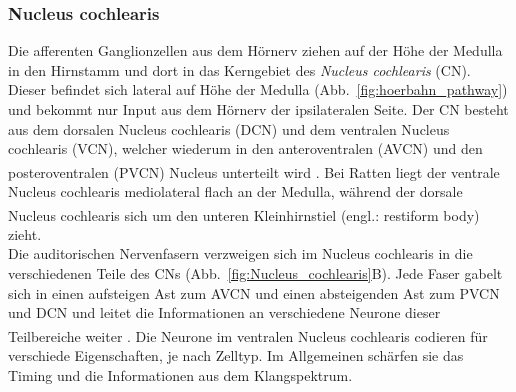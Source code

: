 \documentclass[12pt,a4paper,pdftex]{article}
\begin{document}
\subsubsection*{Nucleus cochlearis}

Die afferenten Ganglionzellen aus dem Hörnerv ziehen auf der Höhe der Medulla in den Hirnstamm und dort in das Kerngebiet des \textit{Nucleus cochlearis} (CN).  Dieser befindet sich  lateral auf Höhe der Medulla (Abb.~\ref{fig:hoerbahn_pathway}) und bekommt nur Input aus dem Hörnerv der ipsilateralen Seite. Der CN besteht aus dem dorsalen Nucleus cochlearis (DCN) und dem ventralen Nucleus cochlearis (VCN), welcher wiederum in den anteroventralen (AVCN) und den posteroventralen (PVCN) Nucleus unterteilt wird \textsuperscript{\cite[22]{paxinos2014rat}}. Bei Ratten liegt der ventrale Nucleus cochlearis mediolateral flach an der Medulla, während der dorsale Nucleus cochlearis sich um den unteren Kleinhirnstiel (engl.: restiform body) \textsuperscript{\cite[22]{paxinos2014rat}} zieht.
\\ \noindent Die auditorischen Nervenfasern verzweigen sich im Nucleus cochlearis in die verschiedenen Teile des CNs (Abb.~\ref{fig:Nucleus_cochlearis}B). Jede Faser gabelt sich in einen aufsteigen Ast zum AVCN und einen absteigenden Ast zum PVCN und DCN und leitet die Informationen an verschiedene Neurone dieser Teilbereiche weiter \textsuperscript{\cite[22]{paxinos2014rat}}. Die Neurone im ventralen Nucleus cochlearis codieren für verschiede Eigenschaften, je nach Zelltyp. Im Allgemeinen schärfen sie das Timing und die Informationen aus dem Klangspektrum. 
\\
\end{document}
